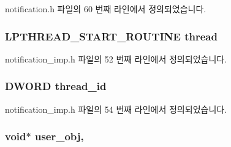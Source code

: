 notification.\+h 파일의 60 번째 라인에서 정의되었습니다.

\subsubsection[{\texorpdfstring{thread}{thread}}]{\setlength{\rightskip}{0pt plus 5cm}L\+P\+T\+H\+R\+E\+A\+D\+\_\+\+S\+T\+A\+R\+T\+\_\+\+R\+O\+U\+T\+I\+NE thread\hspace{0.3cm}{\ttfamily [private]}}\hypertarget{classavdecc__lib_1_1notification__imp_aa930d342e4c53bcc9bf4da7995c81a3b}{}\label{classavdecc__lib_1_1notification__imp_aa930d342e4c53bcc9bf4da7995c81a3b}


notification\+\_\+imp.\+h 파일의 52 번째 라인에서 정의되었습니다.

\subsubsection[{\texorpdfstring{thread\+\_\+id}{thread_id}}]{\setlength{\rightskip}{0pt plus 5cm}D\+W\+O\+RD thread\+\_\+id\hspace{0.3cm}{\ttfamily [private]}}\hypertarget{classavdecc__lib_1_1notification__imp_afb0cb0dfb6676a8802089b63ae981f37}{}\label{classavdecc__lib_1_1notification__imp_afb0cb0dfb6676a8802089b63ae981f37}


notification\+\_\+imp.\+h 파일의 54 번째 라인에서 정의되었습니다.

\subsubsection[{\texorpdfstring{user\+\_\+obj}{user_obj}}]{\setlength{\rightskip}{0pt plus 5cm}void$\ast$ user\+\_\+obj\hspace{0.3cm}{\ttfamily [protected]}, {\ttfamily [inherited]}}\hypertarget{classavdecc__lib_1_1notification_af3646c45b560aeab38e708886dec0d93}{}\label{classavdecc__lib_1_1notification_af3646c45b560aeab38e708886dec0d93}


